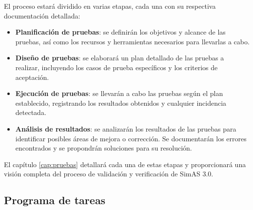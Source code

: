El proceso estará dividido en varias etapas, cada una con su respectiva documentación detallada:

\begin{itemize}
    \item \textbf{Planificación de pruebas}: se definirán los objetivos y alcance de las pruebas, así como los recursos y herramientas necesarios para llevarlas a cabo.
    
    \item \textbf{Diseño de pruebas}: se elaborará un plan detallado de las pruebas a realizar, incluyendo los casos de prueba específicos y los criterios de aceptación.
    
    \item \textbf{Ejecución de pruebas}: se llevarán a cabo las pruebas según el plan establecido, registrando los resultados obtenidos y cualquier incidencia detectada.
    
    \item \textbf{Análisis de resultados}: se analizarán los resultados de las pruebas para identificar posibles áreas de mejora o corrección. Se documentarán los errores encontrados y se propondrán soluciones para su resolución.
\end{itemize}

El capítulo \ref{cap:pruebas} detallará cada una de estas etapas y proporcionará una visión completa del proceso de validación y verificación de SimAS 3.0.


\subsection{Programa de tareas}

